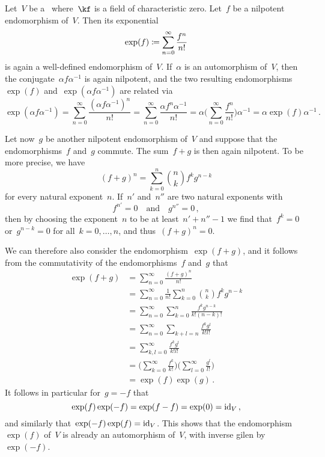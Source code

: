 \begin{recall}
	Let~$V$ be a~\vectorspace{$\kf$} where~$\kf$ is a field of characteristic zero.
	Let~$f$ be a nilpotent endomorphism of~$V$.
	Then its exponential
	\[
		\exp(f)
		\coloneqq
		\sum_{n=0}^\infty
		\frac{f^n}{n!}
		\label{exponential}
	\]
	is again a well-defined endomorphism of~$V$.
	If~$\alpha$ is an automorphism of~$V$, then the conjugate~$\alpha f \alpha^{-1}$ is again nilpotent, and the two resulting endomorphisms~$\exp(f)$ and~$\exp(\alpha f \alpha^{-1})$ are related via
	\[
		\exp( \alpha f \alpha^{-1} )
		=
		\sum_{n=0}^\infty
		\frac{ (\alpha f \alpha^{-1})^n }{n!}
		=
		\sum_{n=0}^\infty
		\frac{ \alpha f^n \alpha^{-1} }{n!}
		=
		\alpha
		\Biggl(
			\sum_{n=0}^\infty
			\frac{f^n}{n!}
		\Biggr)
		\alpha^{-1}
		=
		\alpha \exp(f) \alpha^{-1} \,.
	\]

	Let now~$g$ be another nilpotent endomorphism of~$V$ and suppose that the endomorphisms~$f$ and~$g$ commute.
	The sum~$f + g$ is then again nilpotent.
	To be more precise, we have
	\[
		(f + g)^n
		=
		\sum_{k=0}^n
		\binom{n}{k}
		f^k g^{n-k}
	\]
	for every natural exponent~$n$.
	If~$n'$ and~$n''$ are two natural exponents with
	\[
		f^{n'} = 0
		\quad\text{and}\quad
		g^{n''} = 0 \,,
	\]
	then by choosing the exponent~$n$ to be at least~$n' + n'' - 1$ we find that~$f^k = 0$ or~$g^{n-k} = 0$ for all~$k = 0, \dotsc, n$, and thus~$(f + g)^n = 0$.

	We can therefore also consider the endomorphism~$\exp(f + g)$, and it follows from the commutativity of the endomorphisms~$f$ and~$g$ that
	\begingroup
	\allowdisplaybreaks
	\begin{align*}
		\exp(f + g)
		&=
		\sum_{n=0}^\infty
		\frac{(f + g)^n}{n!}
		\\
		&=
		\sum_{n=0}^\infty
		\frac{1}{n!}
		\sum_{k=0}^n
		\binom{n}{k}
		f^k g^{n-k}
		\\
		&=
		\sum_{n=0}^\infty
		\sum_{k=0}^n
		\frac{f^k g^{n-k}}{k!(n-k)!}
		\\
		&=
		\sum_{n=0}^\infty
		\sum_{k + l = n}
		\frac{f^k g^l}{k! l!}
		\\
		&=
		\sum_{k, l = 0}^\infty
		\frac{f^k g^l}{k! l!}
		\\
		&=
		\Biggl(
			\sum_{k=0}^\infty
			\frac{f^k}{k!}
		\Biggr)
		\Biggl(
			\sum_{l=0}^\infty
			\frac{g^l}{l!}
		\Biggr)
		\\
		&=
		\exp(f) \exp(g) \,.
	\end{align*}
	\endgroup
	It follows in particular for~$g = -f$ that
	\[
		\exp(f) \exp(-f) = \exp(f - f) = \exp(0) = \mathrm{id}_V \,,
	\]
	and similarly that~$\exp(-f) \exp(f) = \mathrm{id}_V$.
	This shows that the endomorphism~$\exp(f)$ of~$V$ is already an automorphism of~$V$, with inverse gilen by~$\exp(-f)$.
\end{recall}


